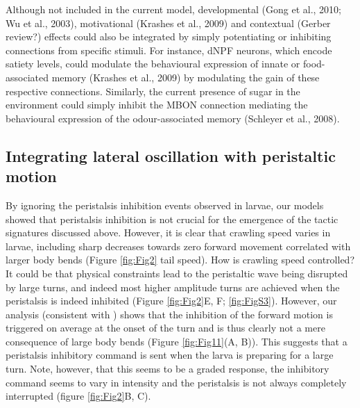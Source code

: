 \documentclass[10pt,a4paper]{article}
\begin{document}
Although not included in the current model, developmental (Gong et al., 2010; Wu et al., 2003), motivational (Krashes et al., 2009) and contextual (Gerber review?) effects could also be integrated by simply potentiating or inhibiting connections from specific stimuli. For instance, dNPF neurons, which encode satiety levels, could modulate the behavioural expression of innate or food-associated memory (Krashes et al., 2009) by modulating the gain of these respective connections. Similarly, the current presence of sugar in the environment could simply inhibit the MBON connection mediating the behavioural expression of the odour-associated memory (Schleyer et al., 2008).

\subsection{Integrating lateral oscillation with peristaltic motion}
By ignoring the peristalsis inhibition events observed in larvae, our models showed that peristalsis inhibition is not crucial for the emergence of the tactic signatures discussed above. However, it is clear that crawling speed varies in larvae, including sharp decreases towards zero forward movement correlated with larger body bends (Figure \ref{fig:Fig2} tail speed). How is crawling speed controlled? It could be that physical constraints lead to the peristaltic wave being disrupted by large turns, and indeed most higher amplitude turns are achieved when the peristalsis is indeed inhibited (Figure \ref{fig:Fig2}E, F; \ref{fig:FigS3}). However, our analysis (consistent with \citet{gepner2015computations}) shows that the inhibition of the forward motion is triggered on average at the onset of the turn and is thus clearly not a mere consequence of large body bends (Figure \ref{fig:Fig11}(A, B)). This suggests that a peristalsis inhibitory command is sent when the larva is preparing for a large turn. Note, however, that this seems to be a graded response, the inhibitory command seems to vary in intensity and the peristalsis is not always completely interrupted (figure \ref{fig:Fig2}B, C).
\end{document}
